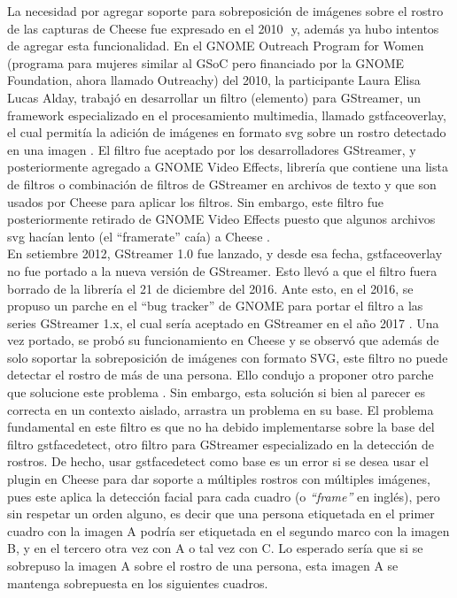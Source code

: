 \documentclass[a4paper,openright,12pt]{report}
\begin{document}
La necesidad por agregar soporte para sobreposición de imágenes sobre el rostro
de las capturas de Cheese fue expresado en el 2010 ⁠\cite{Bug6279256} y, además
ya hubo intentos de agregar esta funcionalidad. En el GNOME Outreach Program for
Women (programa para mujeres similar al GSoC pero financiado por la GNOME
Foundation, ahora llamado Outreachy) del 2010, la participante Laura Elisa Lucas
Alday, trabajó en desarrollar un filtro (elemento) para GStreamer, un framework
especializado en el procesamiento multimedia, llamado gstfaceoverlay, el cual
permitía la adición de imágenes en formato svg sobre un rostro detectado en una
imagen \cite{faceoverlay}\cite{gopw1}. El filtro fue aceptado por los
desarrolladores GStreamer, y posteriormente agregado a GNOME Video Effects,
librería que contiene una lista de filtros o combinación de filtros de GStreamer
en archivos de texto y que son usados por Cheese para aplicar los filtros. Sin
embargo, este filtro fue posteriormente retirado de GNOME Video Effects puesto
que algunos archivos svg hacían lento (el “framerate” caía) a Cheese
\cite{Bug6641489}.\\


En setiembre 2012, GStreamer 1.0 fue lanzado, y desde esa fecha, gstfaceoverlay
no fue portado a la nueva versión de GStreamer. Esto llevó a que el filtro fuera
borrado de la librería el 21 de diciembre del 2016. Ante esto, en el 2016, se
propuso un parche en el ``bug tracker'' de GNOME para portar el filtro a las
series GStreamer 1.x, el cual sería aceptado en GStreamer en el año 2017
\cite{Bug7640127}. Una vez portado, se probó su funcionamiento en Cheese
\cite{CFOCHfunnyStickersCheese} y se observó que además de solo soportar la
sobreposición de imágenes con formato SVG, este filtro no puede detectar el
rostro de más de una persona. Ello condujo a proponer otro parche que solucione
este problema \cite{Bug7691771}. Sin embargo, esta solución si bien al parecer
es correcta en un contexto aislado, arrastra un problema en su base. El problema
fundamental en este filtro es que no ha debido implementarse sobre la base del
filtro gstfacedetect, otro filtro para GStreamer especializado en la detección
de rostros. De hecho, usar gstfacedetect como base es un error si se
desea usar el plugin en Cheese para dar soporte a múltiples rostros con
múltiples imágenes, pues este aplica la detección facial para cada cuadro (o
\textit{“frame”} en inglés), pero sin respetar un orden alguno, es decir que una
persona etiquetada en el primer cuadro con la imagen A podría ser etiquetada en
el segundo marco con la imagen B, y en el tercero otra vez con A o tal vez con
C. Lo esperado sería que si se sobrepuso la imagen A sobre el rostro de una
persona, esta imagen A se mantenga sobrepuesta en los siguientes cuadros.\\
\end{document}
